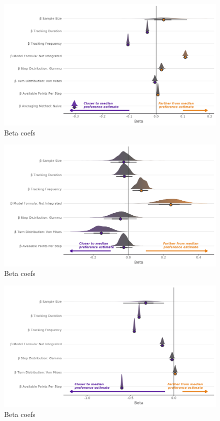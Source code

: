 \documentclass[10pt,a4paper]{article}
\begin{document}
\begin{figure}
\includegraphics[width=1\linewidth]{../figures/ssfBrms_effectsPlot} \caption{Beta coefs}\label{fig:effectPlotSSF}
\end{figure}

\begin{figure}
\includegraphics[width=1\linewidth]{../figures/twoStepBrms_effectsPlot} \caption{Beta coefs}\label{fig:effectPlotTwoStep}
\end{figure}

\begin{figure}
\includegraphics[width=1\linewidth]{../figures/poisBrms_effectsPlot} \caption{Beta coefs}\label{fig:effectPlotPois}
\end{figure}
\end{document}
